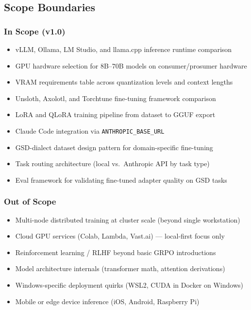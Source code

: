 \documentclass[11pt,letterpaper]{article}
\begin{document}
\subsection{Scope Boundaries}

\subsubsection{In Scope (v1.0)}
\begin{itemize}[leftmargin=*]
  \item vLLM, Ollama, LM Studio, and llama.cpp inference runtime comparison
  \item GPU hardware selection for 8B--70B models on consumer/prosumer hardware
  \item VRAM requirements table across quantization levels and context lengths
  \item Unsloth, Axolotl, and Torchtune fine-tuning framework comparison
  \item LoRA and QLoRA training pipeline from dataset to GGUF export
  \item Claude Code integration via \texttt{ANTHROPIC\_BASE\_URL}
  \item GSD-dialect dataset design pattern for domain-specific fine-tuning
  \item Task routing architecture (local vs.\ Anthropic API by task type)
  \item Eval framework for validating fine-tuned adapter quality on GSD tasks
\end{itemize}

\subsubsection{Out of Scope}
\begin{itemize}[leftmargin=*]
  \item Multi-node distributed training at cluster scale (beyond single workstation)
  \item Cloud GPU services (Colab, Lambda, Vast.ai) --- local-first focus only
  \item Reinforcement learning / RLHF beyond basic GRPO introductions
  \item Model architecture internals (transformer math, attention derivations)
  \item Windows-specific deployment quirks (WSL2, CUDA in Docker on Windows)
  \item Mobile or edge device inference (iOS, Android, Raspberry Pi)
\end{itemize}
\end{document}
